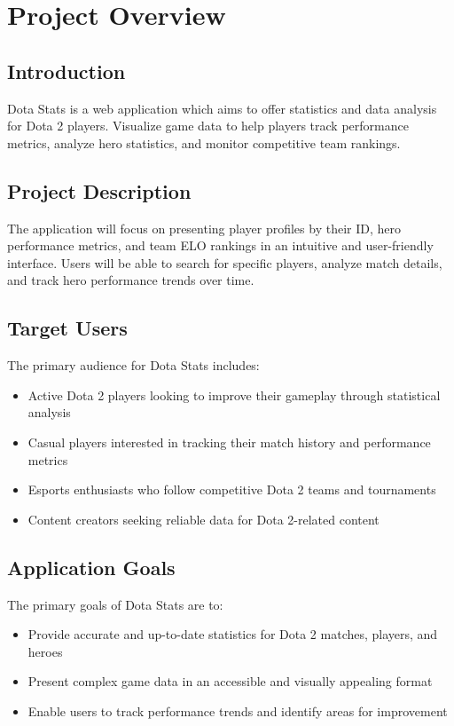 \section{Project Overview}
\subsection{Introduction}
Dota Stats is a web application which aims to offer statistics and data analysis for Dota 2 players. Visualize game data to help players track performance metrics, analyze hero statistics, and monitor competitive team rankings.

\subsection{Project Description}
The application will focus on presenting player profiles by their ID, hero performance metrics, and team ELO rankings in an intuitive and user-friendly interface. Users will be able to search for specific players, analyze match details, and track hero performance trends over time.

\subsection{Target Users}
The primary audience for Dota Stats includes:
\begin{itemize}
    \item Active Dota 2 players looking to improve their gameplay through statistical analysis
    \item Casual players interested in tracking their match history and performance metrics
    \item Esports enthusiasts who follow competitive Dota 2 teams and tournaments
    \item Content creators seeking reliable data for Dota 2-related content
\end{itemize}

\subsection{Application Goals}
The primary goals of Dota Stats are to:
\begin{itemize}
    \item Provide accurate and up-to-date statistics for Dota 2 matches, players, and heroes
    \item Present complex game data in an accessible and visually appealing format
    \item Enable users to track performance trends and identify areas for improvement
\end{itemize}